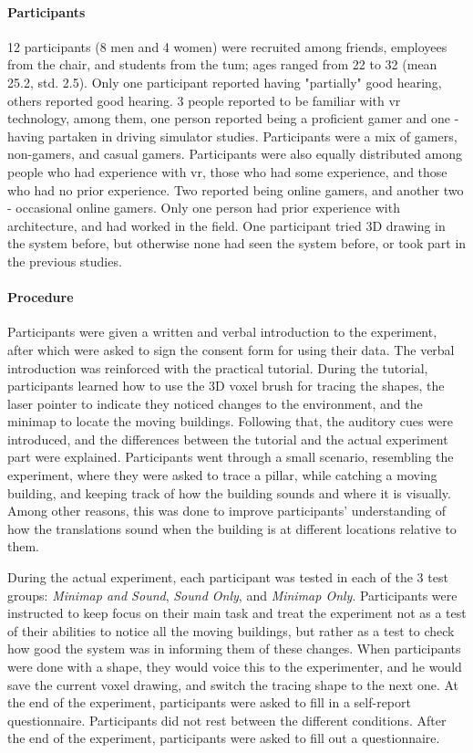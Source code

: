 \paragraph{Participants}
12 participants (8 men and 4 women) were recruited among friends, employees from the chair, and students from the \gls{tum}; ages ranged from 22 to 32 (mean 25.2, std. 2.5). Only one participant reported having "partially" good hearing, others reported good hearing. 3 people reported to be familiar with \gls{vr} technology, among them, one person reported being a proficient gamer and one - having partaken in driving simulator studies. Participants were a mix of gamers, non-gamers, and casual gamers. Participants were also equally distributed among people who had experience with \gls{vr}, those who had some experience, and those who had no prior experience. Two reported being online gamers, and another two - occasional online gamers. Only one person had prior experience with architecture, and had worked in the field. One participant tried 3D drawing in the system before, but otherwise none had seen the system before, or took part in the previous studies.

\paragraph{Procedure}
Participants were given a written and verbal introduction to the experiment,
after which were asked to sign the consent form for using their data. %
The verbal introduction was reinforced with the practical tutorial. During the tutorial, participants learned how to use the 3D voxel brush for tracing the shapes, the laser pointer to indicate they noticed changes to the environment, and the minimap to locate the moving buildings. Following that, the auditory cues were introduced, and the differences between the tutorial and the actual experiment part were explained. Participants went through a small scenario, resembling the experiment, where they were asked to trace a pillar, while catching a moving building, and keeping track of how the building sounds and where it is visually. Among other reasons, this was done to improve participants' understanding of how the translations sound when the building is at different locations relative to them.

During the actual experiment, each participant was tested in each of the 3 test groups: \textit{Minimap and Sound}, \textit{Sound Only}, and \textit{Minimap Only}. Participants were instructed to keep focus on their main task and treat the experiment not as a test of their abilities to notice all the moving buildings, but rather as a test to check how good the system was in informing them of these changes. 
When participants were done with a shape, they would voice this to the experimenter, and he would save the current voxel drawing, and switch the tracing shape to the next one.
At the end of the experiment, participants were asked to fill in a self-report questionnaire.
Participants did not rest between the different conditions. 
After the end of the experiment, participants were asked to fill out a questionnaire. %

